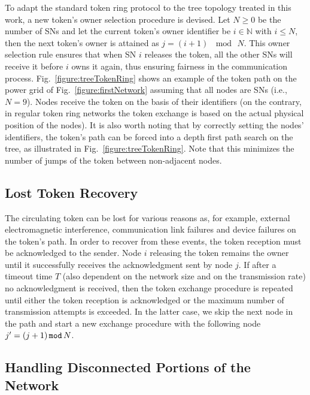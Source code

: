 \documentclass[journal]{IEEEtran}
\newcommand{\fig}[1]{Fig.~\ref{#1}}
\begin{document}
To adapt the standard token ring protocol to the tree topology treated in this work, a new token's owner selection procedure is devised. Let $N \geq 0$ be the number of SNs and let the current token's owner identifier be $i \in \mathbb{N}$ with $i \leq N$, then the next token's owner is attained as $j = (i+1) \, \mod \, N$. This owner selection rule ensures that when SN $i$ releases the token, all the other SNs will receive it before $i$ owns it again, thus ensuring fairness in the communication process. \fig{figure:treeTokenRing} shows an example of the token path on the power grid of \fig{figure:firstNetwork} assuming that all nodes are SNs (i.e., $N=9$). Nodes receive the token on the basis of their identifiers (on the contrary, in regular token ring networks the token exchange is based on the actual physical position of the nodes). It is also worth noting that by correctly setting the nodes' identifiers, the token's path can be forced into a depth first path search on the tree, as illustrated in \fig{figure:treeTokenRing}. Note that this minimizes the number of jumps of the token between non-adjacent nodes.

\subsection{Lost Token Recovery}

The circulating token can be lost for various reasons as, for example, external electromagnetic interference, communication link failures and device failures on the token's path. In order to recover from these events, the token reception must be acknowledged to the sender. Node $i$ releasing the token remains the owner until it successfully receives the acknowledgment sent by node $j$. If after a timeout time $T$ (also dependent on the network size and on the transmission rate) no acknowledgment is received, then the token exchange procedure is repeated until either the token reception is acknowledged or the maximum number of transmission attempts is exceeded. In the latter case, we skip the next node in the path and start a new exchange procedure with the following node $j'=(j+1) \, {\tt mod} \, N$.

\subsection{Handling Disconnected Portions of the Network}
\end{document}
